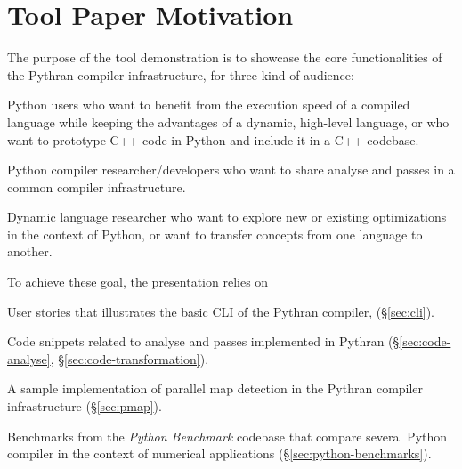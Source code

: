 \documentclass{llncs}
\begin{document}
\setcounter{page}{6}



%
%
%

\section*{Tool Paper Motivation}

The purpose of the tool demonstration is to showcase the core functionalities
of the Pythran compiler infrastructure, for three kind of audience:
\begin{inparaenum} \item Python users who want to benefit from the execution
        speed of a compiled language while keeping the advantages of a dynamic,
        high-level language, or who want to prototype C++ code in Python and
        include it in a C++ codebase.  \item Python compiler
        researcher/developers who want to share analyse and passes in a common
    compiler infrastructure.  \item Dynamic language researcher who want to
        explore new or existing optimizations in the context of Python, or want
        to transfer concepts from one language to another.  \end{inparaenum}

To achieve these goal, the presentation relies on \begin{inparaenum} \item User
    stories that illustrates the basic \ac{CLI} of the Pythran compiler,
(\S\ref{sec:cli}).  \item Code snippets related to analyse and passes
    implemented in Pythran (\S\ref{sec:code-analyse},
\S\ref{sec:code-transformation}). \item A sample implementation of parallel map
detection in the Pythran compiler infrastructure (\S\ref{sec:pmap}).  \item
Benchmarks from the \emph{Python Benchmark} codebase that compare several
Python compiler in the context of numerical applications
(\S\ref{sec:python-benchmarks}). \end{inparaenum}
\end{document}
